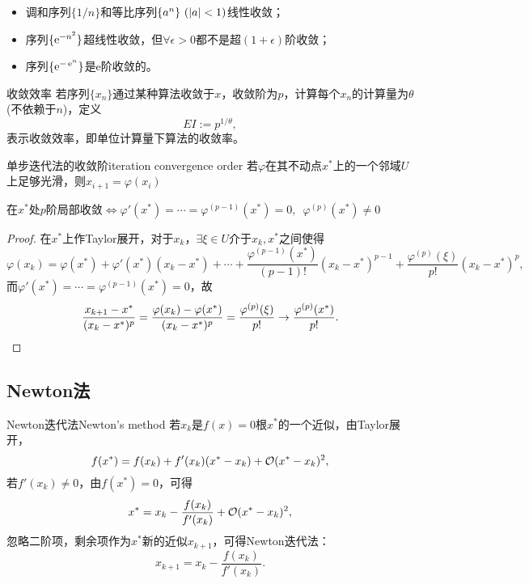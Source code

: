 \begin{example}
    {}{}
    \begin{itemize}
        \item 调和序列$\{1/n\}$和等比序列$\{a^n\}~(\left\lvert a\right\rvert<1)$线性收敛；
        \item 序列$\{\mathop{}\!\mathrm{e}^{-n^2}\}$超线性收敛，但$\forall\epsilon>0$都不是超$(1+\epsilon)$阶收敛；
        \item 序列$\{\mathop{}\!\mathrm{e}^{-\mathop{}\!\mathrm{e}^ n}\}$是e阶收敛的。
    \end{itemize}
\end{example}

\begin{definition}
    {收敛效率}{}
    若序列$\{x_n\}$通过某种算法收敛于$x$，收敛阶为$p$，计算每个$x_n$的计算量为$\theta$ (不依赖于$n$)，定义
    \[
        EI:=p^{1/\theta},
    \]
    表示收敛效率，即单位计算量下算法的收敛率。
\end{definition}

\begin{theorem}
    {单步迭代法的收敛阶}{iteration convergence order}
    若$\varphi$在其不动点$x^*$上的一个邻域$U$上足够光滑，则$x_{i+1}=\varphi(x_i)$
    \begin{center}
        在$x^*$处$p$阶局部收敛$\iff\varphi'(x^*)=\cdots=\varphi^{(p-1)}(x^*)=0,\enspace\varphi^{(p)}(x^*)\neq 0$
    \end{center}
\end{theorem}

\begin{proof}
    在$x^*$上作Taylor展开，对于$x_k$，$\exists\xi\in U$介于$x_k,x^*$之间使得
    \[
        \varphi(x_k)=\varphi(x^*)+\varphi'(x^*)(x_k-x^*)+\cdots+\frac{\varphi^{(p-1)}(x^*)}{(p-1)!}(x_k-x^*)^{p-1}+\frac{\varphi^{(p)}(\xi)}{p!}(x_k-x^*)^p,
    \]
    而$\varphi'(x^*)=\cdots=\varphi^{(p-1)}(x^*)=0$，故
    \[
        \frac{x_{k+1}-x^*}{(x_k-x^*)^p}=\frac{\varphi(x_k)-\varphi(x^*)}{(x_k-x^*)^p}
        =\frac{\varphi^{(p)}(\xi)}{p!}\to\frac{\varphi^{(p)}(x^*)}{p!}.
        \qedhere
    \]
\end{proof}

\subsection{Newton法}

\begin{theorem}
    {Newton迭代法}{Newton's method}
    若$x_k$是$f(x)=0$根$x^*$的一个近似，由Taylor展开，
    \[
        f(x^*)=f(x_k)+f'(x_k)(x^*-x_k)+\mathcal O(x^*-x_k)^2,
    \]
    若$f'(x_k)\neq 0$，由$f(x^*)=0$，可得 
    \[
        x^*=x_k-\frac{f(x_k)}{f'(x_k)}+\mathcal O(x^*-x_k)^2,
    \]
    忽略二阶项，剩余项作为$x^*$新的近似$x_{k+1}$，可得Newton迭代法：
    \begin{equation}
        \label{eqn:Newton iter}
        x_{k+1}=x_k-\frac{f(x_k)}{f'(x_k)}.
    \end{equation}
\end{theorem}


